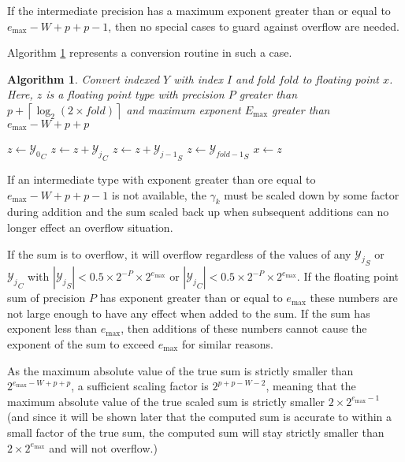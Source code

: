 \documentclass[12pt]{article}
\providecommand{\ceil}[1]{\left \lceil #1 \right \rceil }
\providecommand{\max}{\ensuremath{\text{max}}}
\theoremstyle{plain}
\newtheorem{alg}{Algorithm}[section]
\begin{document}
    If the intermediate precision has a maximum exponent greater than or equal to $e_{\max} - W + p + p - 1$, then no special cases to guard against overflow are needed.

    Algorithm \ref{alg:conv2float} represents a conversion routine in such a case.

    \begin{alg}
      Convert indexed $Y$ with index $I$ and fold $fold$ to floating point $x$. Here, $z$ is a floating point type with precision $P$ greater than $p + \ceil{\log_2(2 \times fold)}$ and maximum exponent $E_{\max}$ greater than $e_{\max} - W + p + p$
      \begin{algorithmic}
          \State $z \gets {\mathcal{Y}_0}_C$
            \State $z \gets z + {\mathcal{Y}_j}_C$
            \State $z \gets z + {\mathcal{Y}_{j - 1}}_S$
          \EndFor
          \State $z \gets {\mathcal{Y}_{fold - 1}}_S$
          \State $x \gets z$
        \EndFunction
      \end{algorithmic}
      \label{alg:conv2float}
    \end{alg}

    If an intermediate type with exponent greater than ore equal to $e_{\max} - W + p + p - 1$ is not available, the $\gamma_k$ must be scaled down by some factor during addition and the sum scaled back up when subsequent additions can no longer effect an overflow situation.

    If the sum is to overflow, it will overflow regardless of the values of any ${\mathcal{Y}_j}_S$ or ${\mathcal{Y}_j}_C$ with $|{\mathcal{Y}_j}_S| < 0.5 \times 2^{-P} \times 2^{e_{\max}}$ or $|{\mathcal{Y}_j}_C| < 0.5 \times 2^{-P} \times 2^{e_{\max}}$. If the floating point sum of precision $P$ has exponent greater than or equal to $e_{\max}$ these numbers are not large enough to have any effect when added to the sum. If the sum has exponent less than $e_{\max}$, then additions of these numbers cannot cause the exponent of the sum to exceed $e_{\max}$ for similar reasons.

    As the maximum absolute value of the true sum is strictly smaller than $2^{e_{\max} - W + p + p}$, a sufficient scaling factor is $2^{p + p - W - 2}$, meaning that the maximum absolute value of the true scaled sum is strictly smaller $2 \times 2^{e_{\max} - 1}$ (and since it will be shown later that the computed sum is accurate to within a small factor of the true sum, the computed sum will stay strictly smaller than $2 \times 2^{e_{\max}}$ and will not overflow.)
\end{document}
